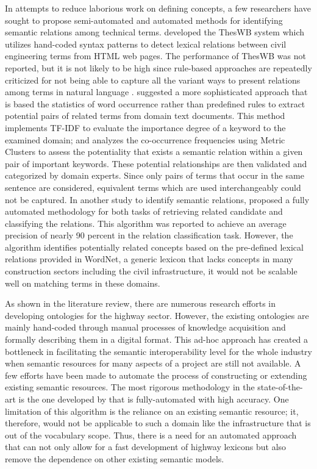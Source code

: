 \documentclass[Journal, BackFigs,NoLists, DoubleSpace]{ascelike}%
\begin{document}
In attempts to reduce laborious work on defining concepts, a few researchers have sought to propose semi-automated and automated methods for identifying semantic relations among technical terms.  developed the ThesWB system which utilizes hand-coded syntax patterns to detect lexical relations between civil engineering terms from HTML web pages. The performance of ThesWB was not reported, but it is not likely to be high since rule-based approaches are repeatedly criticized for not being able to capture all the variant ways to present relations among terms in natural language \cite{Marcus95,navigli10}.  suggested a more sophisticated approach that is based the statistics of word occurrence rather than predefined rules to extract potential pairs of related terms from domain text documents. This method implements TF-IDF to evaluate the importance degree of a keyword to the examined domain; and analyzes the co-occurrence frequencies using Metric Clusters to assess the potentiality that exists a semantic relation within a given pair of important keywords. These potential relationships are then validated and categorized by domain experts. Since only pairs of terms that occur in the same sentence are considered, equivalent terms which are used interchangeably could not be captured. In another study to identify semantic relations,  proposed a fully automated methodology for both tasks of retrieving related candidate and classifying the relations. This algorithm was reported to achieve an average precision of nearly 90 percent in the relation classification task. However, the algorithm identifies potentially related concepts based on the pre-defined lexical relations provided in WordNet, a generic lexicon that lacks concepts in many construction sectors including the civil infrastructure, it would not be scalable well on matching terms in these domains.
\par
As shown in the literature review, there are numerous research efforts in developing ontologies for the highway sector. However, the existing ontologies are mainly hand-coded through manual processes of knowledge acquisition and formally describing them in a digital format. This ad-hoc approach has created a bottleneck in facilitating the semantic interoperability level for the whole industry when semantic resources for many aspects of a project are still not available. A few efforts have been made to automate the process of constructing or extending existing semantic resources. The most rigorous methodology in the state-of-the-art is the one developed by  that is fully-automated with high accuracy. One limitation of this algorithm is the reliance on an existing semantic resource; it, therefore, would not be applicable to such a domain like the infrastructure that is out of the vocabulary scope. Thus, there is a need for an automated approach that can not only allow for a fast development of highway lexicons but also remove the dependence on other existing semantic models. 
\end{document}
